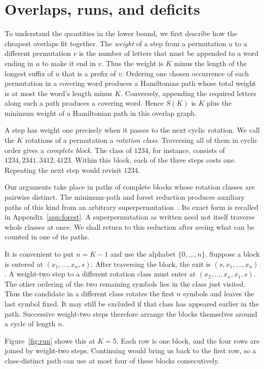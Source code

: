 \section{Overlaps, runs, and deficits}

To understand the quantities in the lower bound, we first describe how
the cheapest overlaps fit together. The \emph{weight} of a step from a
permutation $u$ to a different permutation $v$ is the number of letters
that must be appended to a word ending in $u$ to make it end in $v$.
Thus the weight is $K$ minus the length of the longest suffix of $u$
that is a prefix of $v$.
Ordering one chosen occurrence of each permutation in a covering word
produces a Hamiltonian path whose total weight is at most the word's
length minus $K$. Conversely, appending the required letters along such
a path produces a covering word. Hence $S(K)$ is $K$ plus the minimum
weight of a Hamiltonian path in this overlap graph.

A step has weight one precisely when it passes to the next cyclic
rotation. We call the $K$ rotations of a permutation a \emph{rotation
class}. Traversing all of them in cyclic order gives a \emph{complete
block}. The class of $1234$, for instance, consists of $1234,2341,3412,4123$.
Within this block, each of the three steps costs one. Repeating the next
step would revisit $1234$.

Our arguments take place in paths of complete blocks whose rotation
classes are pairwise distinct. The minimum-path and forest
reduction produces auxiliary paths of this kind from an arbitrary
superpermutation~\cite{pantone-framework}. Its exact form is recalled
in Appendix~\ref{app:forest}. A superpermutation as written
need not itself traverse whole classes at once. We shall return to this
reduction after seeing what can be counted in one of its paths.

It is convenient to put $n=K-1$ and use the alphabet $\{0,\ldots,n\}$.
Suppose a block is entered at $(x_1,\ldots,x_n,s)$. After traversing
the block, the exit is $(s,x_1,\ldots,x_n)$. A weight-two step to a different rotation class must
enter at $(x_2,\ldots,x_n,x_1,s)$.
The other ordering of the two remaining symbols lies in the class just
visited. Thus the candidate in a different class rotates the first $n$ symbols
and leaves the last symbol fixed. It may still be excluded if that class
has appeared earlier in the path.
Successive weight-two steps therefore arrange the blocks themselves
around a cycle of length $n$.

Figure~\ref{fig:run} shows this at $K=5$. Each row is one block, and
the four rows are joined by weight-two steps. Continuing would bring us
back to the first row, so a class-distinct path can use at most four
of these blocks consecutively.

